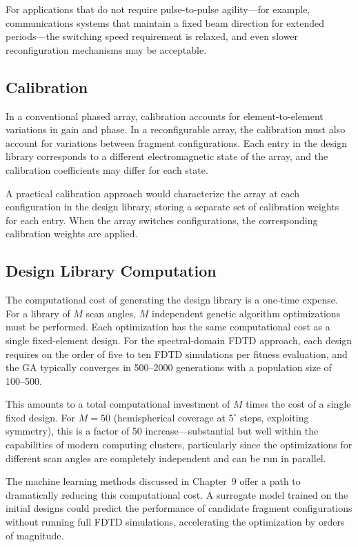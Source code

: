 For applications that do not require pulse-to-pulse agility---for example, communications systems that maintain a fixed beam direction for extended periods---the switching speed requirement is relaxed, and even slower reconfiguration mechanisms may be acceptable.

\subsection{Calibration}

In a conventional phased array, calibration accounts for element-to-element variations in gain and phase.  In a reconfigurable array, the calibration must also account for variations between fragment configurations.  Each entry in the design library corresponds to a different electromagnetic state of the array, and the calibration coefficients may differ for each state.

A practical calibration approach would characterize the array at each configuration in the design library, storing a separate set of calibration weights for each entry.  When the array switches configurations, the corresponding calibration weights are applied.

\subsection{Design Library Computation}

The computational cost of generating the design library is a one-time expense.  For a library of $M$ scan angles, $M$ independent genetic algorithm optimizations must be performed.  Each optimization has the same computational cost as a single fixed-element design.  For the spectral-domain FDTD approach, each design requires on the order of five to ten FDTD simulations per fitness evaluation, and the GA typically converges in 500--2000 generations with a population size of 100--500.

This amounts to a total computational investment of $M$ times the cost of a single fixed design.  For $M = 50$ (hemispherical coverage at $5^{\circ}$ steps, exploiting symmetry), this is a factor of 50 increase---substantial but well within the capabilities of modern computing clusters, particularly since the optimizations for different scan angles are completely independent and can be run in parallel.

The machine learning methods discussed in Chapter~9 offer a path to dramatically reducing this computational cost.  A surrogate model trained on the initial designs could predict the performance of candidate fragment configurations without running full FDTD simulations, accelerating the optimization by orders of magnitude.


